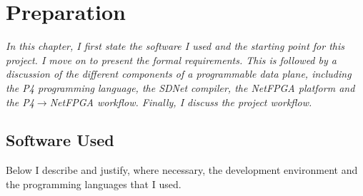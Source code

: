 \chapter{Preparation}
\textit{In this chapter, I first state the software I used and the starting point for this project. I move on to present the formal requirements. This is followed by a discussion of the different components of a programmable data plane, including the P4 programming language, the SDNet compiler, the NetFPGA platform and the P4$\rightarrow$NetFPGA workflow. Finally, I discuss the project workflow.}

\section{Software Used}
Below I describe and justify, where necessary, the development environment and the programming languages that I used.

